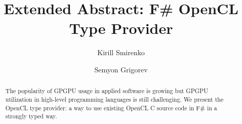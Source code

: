 \documentclass[sigplan,review]{acmart}\settopmatter{printfolios=true}
\begin{document}
\title[]{Extended Abstract: F\# OpenCL Type Provider}         %



\author{Kirill Smirenko}


\author{Semyon Grigorev}


\begin{abstract}
The popularity of GPGPU usage in applied software is growing but GPGPU utilization in high-level programming languages is still challenging.
We present the OpenCL type provider: a way to use existing OpenCL C source code in F\# in a strongly typed way. 
\end{abstract}
\end{document}

